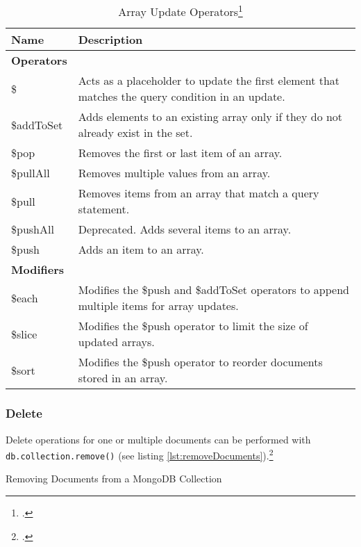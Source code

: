 \begin{savenotes}
\begin{table}[htbp]
\begin{tabular*}{\textwidth}{p{} p{}}
\toprule
	\textbf{Name} 					& \textbf{Description}\\
	\midrule 
	\midrule
	\textbf{Operators} & \\
	\midrule 
	\midrule
	\$			&	Acts as a placeholder to update the first element that matches the query condition in an update.\\
	\$addToSet	&	Adds elements to an existing array only if they do not already exist in the set.\\
	\$pop		&	Removes the first or last item of an array.\\
	\$pullAll	&	Removes multiple values from an array.\\
	\$pull		&	Removes items from an array that match a query statement.\\
	\$pushAll	&	Deprecated. Adds several items to an array.\\
	\$push		&	Adds an item to an array.\\
	\midrule
	\midrule	
	\textbf{Modifiers} & \\
	\midrule
	\midrule
	\$each		&	Modifies the \$push and \$addToSet operators to append multiple items for array updates.\\
	\$slice		&	Modifies the \$push operator to limit the size of updated arrays.\\
	\$sort		&	Modifies the \$push operator to reorder documents stored in an array.\\	
\bottomrule 
\end{tabular*}
  \caption[]{Array Update Operators\footcite[][]{mongo_update}}
  \label{tab:query-selectors-compare}
\end{table}
\end{savenotes}

\FloatBarrier

\subsubsection{Delete}
Delete operations for one or multiple documents can be performed with
\texttt{db.collection.remove()} (see listing \ref{lst:removeDocuments}).\footcite[Cf.][p. 83 et.
sqq.]{mongo_crud_manual}

\begin{code}
	\caption{Removing Documents from a MongoDB Collection}
	\label{lst:removeDocuments}
\end{code}

